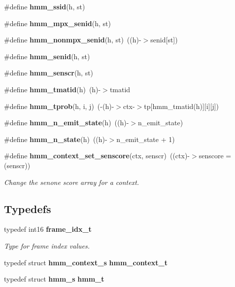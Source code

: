 \begin{DoxyCompactItemize}
\item 
\#define {\bfseries hmm\-\_\-ssid}(h, st)
\item 
\#define {\bfseries hmm\-\_\-mpx\-\_\-senid}(h, st)
\item 
\#define {\bfseries hmm\-\_\-nonmpx\-\_\-senid}(h, st)~((h)-\/$>$senid[st])\label{hmm_8h_a45850600910ae0839f34792b00b5970b}

\item 
\#define {\bfseries hmm\-\_\-senid}(h, st)
\item 
\#define {\bfseries hmm\-\_\-senscr}(h, st)
\item 
\#define {\bfseries hmm\-\_\-tmatid}(h)~(h)-\/$>$tmatid\label{hmm_8h_a749193daefb4247e56dbc6b3f2d75c14}

\item 
\#define {\bfseries hmm\-\_\-tprob}(h, i, j)~(-\/(h)-\/$>$ctx-\/$>$tp[hmm\-\_\-tmatid(h)][i][j])\label{hmm_8h_a3d6e71af2d2ce897e63a5ee8c5741593}

\item 
\#define {\bfseries hmm\-\_\-n\-\_\-emit\-\_\-state}(h)~((h)-\/$>$n\-\_\-emit\-\_\-state)\label{hmm_8h_a4ef324f17daafd4de126b88671c7e93c}

\item 
\#define {\bfseries hmm\-\_\-n\-\_\-state}(h)~((h)-\/$>$n\-\_\-emit\-\_\-state + 1)\label{hmm_8h_a16311c1d64310ad3a8af33eec0fbe9f1}

\item 
\#define {\bf hmm\-\_\-context\-\_\-set\-\_\-senscore}(ctx, senscr)~((ctx)-\/$>$senscore = (senscr))\label{hmm_8h_a44d0b5515cb269bf9b95f62aada18cbb}

\begin{DoxyCompactList}\small\item\em Change the senone score array for a context. \end{DoxyCompactList}\end{DoxyCompactItemize}
\subsection*{Typedefs}
\begin{DoxyCompactItemize}
\item 
typedef int16 {\bf frame\-\_\-idx\-\_\-t}
\begin{DoxyCompactList}\small\item\em Type for frame index values. \end{DoxyCompactList}\item 
typedef struct {\bf hmm\-\_\-context\-\_\-s} {\bfseries hmm\-\_\-context\-\_\-t}\label{hmm_8h_a87dd8e0478af63326664232541d2ade6}

\item 
typedef struct {\bf hmm\-\_\-s} {\bfseries hmm\-\_\-t}\label{hmm_8h_a6f69b65f5fd63aa882fbe6002be74c13}

\end{DoxyCompactItemize}
